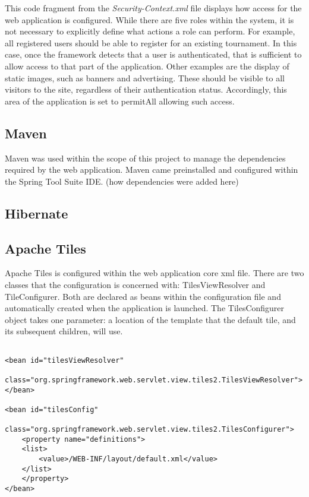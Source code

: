 This code fragment from the \textit{Security-Context.xml} file displays how access for the web application is configured. While there are five roles within the system, it is not necessary to explicitly define what actions a role can perform. For example, all registered users should be able to register for an existing tournament. In this case, once the framework detects that a user is authenticated, that is sufficient to allow access to that part of the application. Other examples are the display of static images, such as banners and advertising. These should be visible to all visitors to the site, regardless of their authentication status. Accordingly, this area of the application is set to permitAll allowing such access.

\subsection{Maven}

Maven was used within the scope of this project to manage the dependencies required by the web application. Maven came preinstalled and configured within the Spring Tool Suite IDE. (how dependencies were added here)

\subsection{Hibernate}

\subsection{Apache Tiles}

Apache Tiles is configured within the web application core xml file. There are two classes that the configuration is concerned with: TilesViewResolver and TileConfigurer. Both are declared as beans within the configuration file and automatically created when the application is launched. The TilesConfigurer object takes one parameter: a location of the template that the default tile, and its subsequent children, will use. \newline

\begin{lstlisting}

<bean id="tilesViewResolver"
	class="org.springframework.web.servlet.view.tiles2.TilesViewResolver">
</bean>

<bean id="tilesConfig"
	class="org.springframework.web.servlet.view.tiles2.TilesConfigurer">
	<property name="definitions">
	<list>
		<value>/WEB-INF/layout/default.xml</value>
	</list>
	</property>
</bean>
\end{lstlisting}

